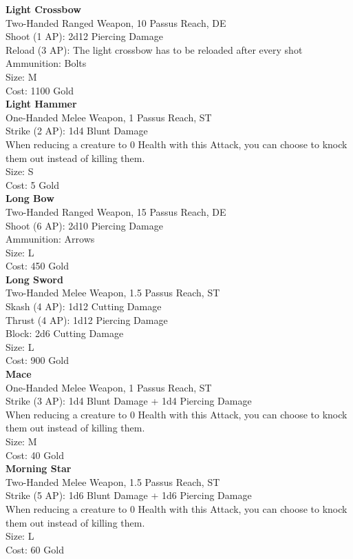 \textbf{Light Crossbow}\\
Two-Handed Ranged Weapon, 10 Passus Reach, DE\\
Shoot (1 AP): 2d12 Piercing Damage\\
Reload (3 AP): The light crossbow has to be reloaded after every shot\\
Ammunition: Bolts\\
Size: M\\
Cost: 1100 Gold\\


\textbf{Light Hammer}\\
One-Handed Melee Weapon, 1 Passus Reach, ST\\
Strike (2 AP): 1d4 Blunt Damage\\
When reducing a creature to 0 Health with this Attack, you can choose to knock them out instead of killing them.\\
Size: S\\
Cost: 5 Gold\\


\textbf{Long Bow}\\
Two-Handed Ranged Weapon, 15 Passus Reach, DE\\
Shoot (6 AP): 2d10 Piercing Damage\\
Ammunition: Arrows\\
Size: L\\
Cost: 450 Gold\\


\textbf{Long Sword}\\
Two-Handed Melee Weapon, 1.5 Passus Reach, ST\\
Skash (4 AP): 1d12 Cutting Damage\\
Thrust (4 AP): 1d12 Piercing Damage\\
Block: 2d6 Cutting Damage\\
Size: L\\
Cost: 900 Gold\\


\textbf{Mace}\\
One-Handed Melee Weapon, 1 Passus Reach, ST\\
Strike (3 AP): 1d4 Blunt Damage + 1d4 Piercing Damage\\
When reducing a creature to 0 Health with this Attack, you can choose to knock them out instead of killing them.\\
Size: M\\
Cost: 40 Gold\\


\textbf{Morning Star}\\
Two-Handed Melee Weapon, 1.5 Passus Reach, ST\\
Strike (5 AP): 1d6 Blunt Damage + 1d6 Piercing Damage\\
When reducing a creature to 0 Health with this Attack, you can choose to knock them out instead of killing them.\\
Size: L\\
Cost: 60 Gold\\


